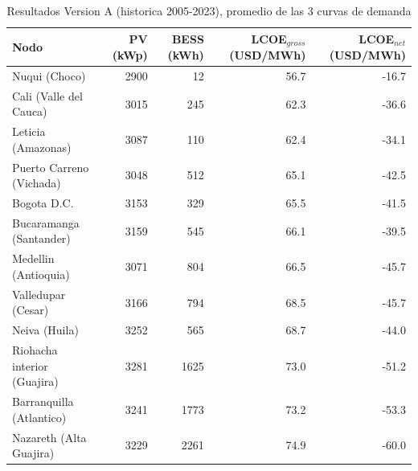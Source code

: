\begin{table}[htbp]
\centering
\caption{Resultados Version A (historica 2005-2023), promedio de las 3 curvas de demanda}
\label{tab:versionA}
\begin{tabular}{lrrrr}
\toprule
Nodo & PV (kWp) & BESS (kWh) & LCOE$_{gross}$ (USD/MWh) & LCOE$_{net}$ (USD/MWh) \\ \midrule
Nuqui (Choco) & 2900 & 12 & 56.7 & -16.7 \\
Cali (Valle del Cauca) & 3015 & 245 & 62.3 & -36.6 \\
Leticia (Amazonas) & 3087 & 110 & 62.4 & -34.1 \\
Puerto Carreno (Vichada) & 3048 & 512 & 65.1 & -42.5 \\
Bogota D.C. & 3153 & 329 & 65.5 & -41.5 \\
Bucaramanga (Santander) & 3159 & 545 & 66.1 & -39.5 \\
Medellin (Antioquia) & 3071 & 804 & 66.5 & -45.7 \\
Valledupar (Cesar) & 3166 & 794 & 68.5 & -45.7 \\
Neiva (Huila) & 3252 & 565 & 68.7 & -44.0 \\
Riohacha interior (Guajira) & 3281 & 1625 & 73.0 & -51.2 \\
Barranquilla (Atlantico) & 3241 & 1773 & 73.2 & -53.3 \\
Nazareth (Alta Guajira) & 3229 & 2261 & 74.9 & -60.0 \\
\bottomrule
\end{tabular}
\end{table}
